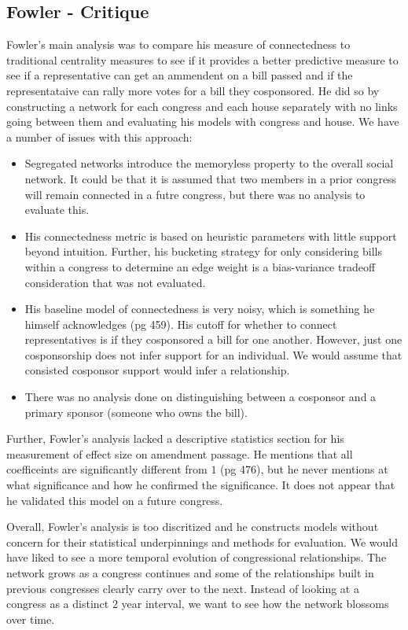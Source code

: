 \subsection{Fowler - Critique}

\vspace{5mm}
\noindent
Fowler's main analysis was to compare his measure of connectedness to 
traditional centrality measures to see if it provides a better predictive 
measure to see if a representative can get an ammendent on a bill passed and 
if the representataive can rally more votes for a bill they cosponsored. He 
did so by constructing a network for each congress and each house separately 
with no links going between them and evaluating his models with congress and 
house. We have a number of issues with this approach:

\begin{itemize}
	\item Segregated networks introduce the memoryless property to the overall 
	social network. It could be that it is assumed that two members in a 
	prior congress will remain connected in a futre congress, but there was no 
	analysis to evaluate this. 
	\item His connectedness metric is based on heuristic parameters with little 
	support beyond intuition. Further, his bucketing strategy for only 
	considering bills within a congress to determine an edge weight is a 
	bias-variance tradeoff consideration that was not evaluated.
	\item His baseline model of connectedness is very noisy, which is something 
	he himself acknowledges (pg 459). His cutoff for whether to connect 
	representatives is if they cosponsored a bill for one another. However, 
	just one cosponsorship does not infer support for an individual. We would 
	assume that consisted cosponsor support would infer a relationship. 
	\item There was no analysis done on distinguishing between a cosponsor and 
	a primary sponsor (someone who owns the bill).
\end{itemize}

\vspace{5mm}
\noindent
Further, Fowler's analysis lacked a descriptive statistics section for his 
measurement of effect size on amendment passage. He mentions that all 
coefficeints are significantly different from $1$ (pg 476), but he never 
mentions at what significance and how he confirmed the significance. It does 
not appear that he validated this model on a future congress.

\vspace{5mm}
\noindent
Overall, Fowler's analysis is too discritized and he constructs models without 
concern for their statistical underpinnings and methods for evaluation. We 
would have liked to see a more temporal evolution of congressional 
relationships. The network grows as a congress continues and some of the 
relationships built in previous congresses clearly carry over to the next. 
Instead of looking at a congress as a distinct $2$ year interval, we want to 
see how the network blossoms over time.